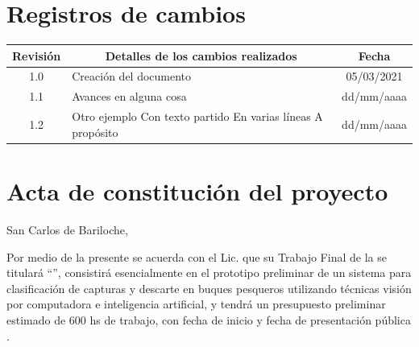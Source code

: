 \documentclass[11pt]{charter}
\begin{document}
\maketitle
\thispagestyle{empty}
\pagebreak


\thispagestyle{empty}
{\setlength{\parskip}{0pt}
\tableofcontents{}
}
\pagebreak


\section{Registros de cambios}
\label{sec:registro}


\begin{table}[ht]
\label{tab:registro}
\centering
\begin{tabularx}{\linewidth}{@{}|c|X|c|@{}}
\hline
\rowcolor[HTML]{C0C0C0} 
Revisión & \multicolumn{1}{c|}{\cellcolor[HTML]{C0C0C0}Detalles de los cambios realizados} & Fecha      \\ \hline
1.0      & Creación del documento                                          & 05/03/2021 \\ \hline
1.1      & Avances en alguna cosa                                          & dd/mm/aaaa \\ \hline
1.2      & Otro ejemplo \newline
		   Con texto partido \newline
		   En varias líneas \newline
		   A propósito                                                     & dd/mm/aaaa \\ \hline
\end{tabularx}
\end{table}

\pagebreak

\section{Acta de constitución del proyecto}
\label{sec:acta}

\begin{flushright}
San Carlos de Bariloche, \fechaInicioName
\end{flushright}

\vspace{2cm}

Por medio de la presente se acuerda con el Lic. \authorname\hspace{1px} que su Trabajo Final de la \degreename\hspace{1px} se titulará ``\ttitle'', consistirá esencialmente en el prototipo preliminar de un sistema para clasificación de capturas y descarte en buques pesqueros utilizando técnicas visión por computadora e inteligencia artificial, y tendrá un presupuesto preliminar estimado de 600 hs de trabajo, con fecha de inicio \fechaInicioName\hspace{1px} y fecha de presentación pública \fechaFinalName.
\end{document}
